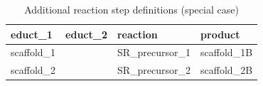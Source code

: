 \begin{table}[htbp]
\centering
\caption{Additional reaction step definitions (special case)}
\label{tab:table11}
\begin{tabular}{llll}
\toprule
educt\_1 & educt\_2 & reaction & product \\
\midrule
scaffold\_1 &  & SR\_precursor\_1 & scaffold\_1B \\
scaffold\_2 &  & SR\_precursor\_2 & scaffold\_2B \\
\bottomrule
\end{tabular}
\end{table}